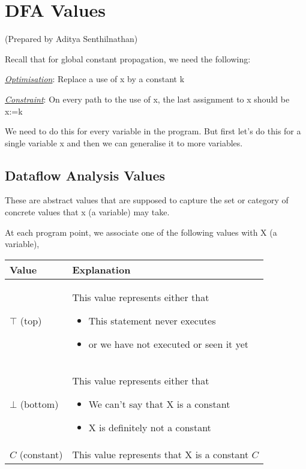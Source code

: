 \setlength{\parindent}{0pt}

\section{DFA Values}

(Prepared by Aditya Senthilnathan)

Recall that for global constant propagation, we need the following:

\vspace{0.3cm}

\underline{\textit{Optimisation}}: Replace a use of x by a constant k

\underline{\textit{Constraint}}: On every path to the use of x, the last assignment to x should be x:=k

\vspace{0.3cm}

We need to do this for every variable in the program. But first let's do this for a single variable x and then we can generalise it to more variables.

\subsection{Dataflow Analysis Values}

These are abstract values that are supposed to capture the set or category of concrete values that x (a variable) may take.

\vspace{0.5cm}

At each program point, we associate one of the following values with X (a variable),
\begin{center}
    \begin{tabular}{| m{2cm} | m{7cm} |}
        \hline
        Value & Explanation \\
        \hline
        $\top$ (top) &
        This value represents either that
        \begin{itemize} 
            \item This statement never executes
            \item or we have not executed or seen it yet
        \end{itemize}\\
        \hline
        $\bot$ (bottom) &
        This value represents either that
        \begin{itemize} 
            \item We can't say that X is a constant
            \item X is definitely not a constant
        \end{itemize}\\
        \hline
        $C$ (constant) &
        This value represents that X is a constant $C$\\
        \hline
    \end{tabular}
\end{center}

